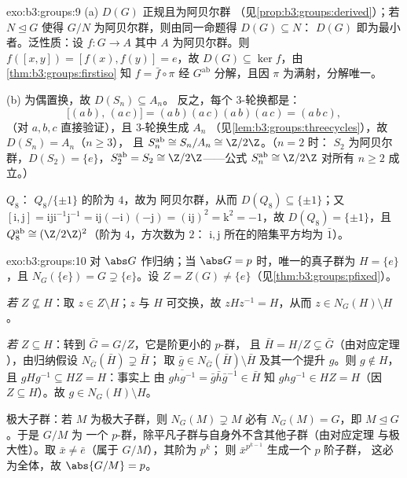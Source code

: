 \begin{solution}{exo:b3:groups:9}
(a) $D(G)$ 正规且为阿贝尔群
（见\cref{prop:b3:groups:derived}）；若 $N \trianglelefteq G$ 使得
$G/N$ 为阿贝尔群，则由同一命题得 $D(G) \subseteq N$：
$D(G)$ 即为最小者。泛性质：设 $f \colon G \to A$
其中 $A$ 为阿贝尔群。则 $f([x,y]) = [f(x), f(y)] = e$，故 $D(G)
\subseteq \ker f$，由\cref{thm:b3:groups:firstiso} 知 $f =
\bar f \circ \pi$ 经 $G^{\mathrm{ab}}$ 分解，且因 $\pi$
为满射，分解唯一。

(b) 为偶置换，故 $D(S_n) \subseteq A_n$。
反之，每个 $3$-轮换都是：
\[
\bigl[(a\,b),\,(a\,c)\bigr] = (a\,b)(a\,c)(a\,b)(a\,c) =
(a\,b\,c),
\]
（对 $a, b, c$ 直接验证），且 $3$-轮换生成 $A_n$
（见\cref{lem:b3:groups:threecycles}），故 $D(S_n) = A_n$（$n \geq 3$），
且 $S_n^{\mathrm{ab}} \cong S_n/A_n \cong \Z/2\Z$。（$n = 2$ 时：
$S_2$ 为阿贝尔群，$D(S_2) = \{e\}$，$S_2^{\mathrm{ab}} = S_2
\cong \Z/2\Z$——公式 $S_n^{\mathrm{ab}} \cong \Z/2\Z$
对所有 $n \geq 2$ 成立。）

$Q_8$： $Q_8/\{\pm 1\}$ 的阶为 $4$，故为
阿贝尔群，从而 $D(Q_8) \subseteq \{\pm 1\}$；又 $[\mathrm i, \mathrm
j] = \mathrm i \mathrm j \mathrm i^{-1}\mathrm j^{-1} = \mathrm
i\mathrm j(-\mathrm i)(-\mathrm j) = (\mathrm i \mathrm j)^2 =
\mathrm k^2 = -1$，故 $D(Q_8) = \{\pm 1\}$，且
$Q_8^{\mathrm{ab}} \cong (\Z/2\Z)^2$（阶为 $4$，方次数为 $2$：
$\mathrm i, \mathrm j$ 所在的陪集平方均为 $\bar 1$）。
\end{solution}

\begin{solution}{exo:b3:groups:10}
对 $\abs G$ 作归纳；当 $\abs G = p$ 时，唯一的真子群为
$H = \{e\}$，且 $N_G(\{e\}) = G \supsetneq
\{e\}$。设 $Z = Z(G) \neq \{e\}$（见\cref{thm:b3:groups:pfixed}）。

\emph{若 $Z \not\subseteq H$}：取 $z \in Z \setminus H$；$z$
与 $H$ 可交换，故 $zHz^{-1} = H$，从而 $z \in N_G(H) \setminus
H$。

\emph{若 $Z \subseteq H$}：转到 $\bar G = G/Z$，它是阶更小的 $p$-群，
且 $\bar H = H/Z \subsetneq \bar G$（由对应定理
），由归纳假设 $N_{\bar G}(\bar H) \supsetneq \bar H$；
取 $\bar g \in N_{\bar G}(\bar H) \setminus \bar H$ 及其一个提升
$g$。则 $g \notin H$，且 $gHg^{-1} \subseteq HZ = H$：事实上
由 $\overline{ghg^{-1}} = \bar g \bar h \bar g^{-1} \in \bar H$ 知
$ghg^{-1} \in HZ = H$（因 $Z \subseteq H$）。故 $g \in
N_G(H)\setminus H$。

极大子群：若 $M$ 为极大子群，则 $N_G(M) \supsetneq M$
必有 $N_G(M) = G$，即 $M \trianglelefteq G$。于是 $G/M$ 为
一个 $p$-群，除平凡子群与自身外不含其他子群（由对应定理
与极大性）。取 $\bar x \neq \bar e$（属于 $G/M$），其阶为 $p^k$；
则 $\bar x^{p^{k-1}}$ 生成一个 $p$ 阶子群，
这必为全体，故 $\abs{G/M} = p$。
\end{solution}

